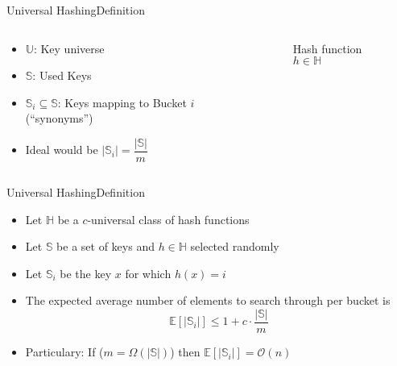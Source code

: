 \begin{frame}{Universal Hashing}{Definition}
  \begin{columns}
    \begin{column}{0.5\linewidth}
      \begin{itemize}
        \item
          {\color{Mittel-Blau}$\mathbb{U}$}:
          Key universe
        \item
          {\color{Mittel-Blau}$\mathbb{S}$}:
          Used Keys
        \item
          {\color{Mittel-Blau}$\mathbb{S}_i \subseteq \mathbb{S}$}:
          Keys mapping to Bucket {\color{Mittel-Blau}$i$} (\enquote{synonyms})
       \item
         Ideal would be
         {\color{Mittel-Blau}$\vert \mathbb{S}_i \vert =\dfrac{\vert \mathbb{S} \vert}{m}$}
      \end{itemize}
    \end{column}
    \begin{column}{0.5\linewidth}
      \begin{figure}[!h]%
        \begin{adjustbox}{width=\linewidth}%
        \end{adjustbox}\vspace*{-2em}
        \caption{Hash function {\color{Mittel-Blau}$h \in \mathbb{H}$}}%
        \label{fig:universal_hashing:hash_function_to_bucket}
      \end{figure}
    \end{column}
  \end{columns}
\end{frame}


\begin{frame}{Universal Hashing}{Definition}
  \begin{itemize}
    \item<1->
      Let {\color{Mittel-Blau}$\mathbb{H}$} be a {\color{Mittel-Blau}$c$}-universal class of hash functions
    \item<2->
      Let {\color{Mittel-Blau}$\mathbb{S}$} be a set of keys and {\color{Mittel-Blau}$h \in \mathbb{H}$} selected randomly
    \item<3->
      Let {\color{Mittel-Blau}$\mathbb{S}_i$} be the key {\color{Mittel-Blau}$x$} for which {\color{Mittel-Blau}$h(x) = i$}
    \item<4->
      The expected average number of elements to search through per 
      bucket is {\color{Mittel-Blau}\[\mathbb{E}\left[\vert \mathbb{S}_i \vert\right]
        \leq 1 + c \cdot \frac{\vert \mathbb{S} \vert}{m}\]}
    \item<5->
      Particulary: If  {\color{Mittel-Blau}($m = \Omega(\vert \mathbb{S} \vert)$)} then
      {\color{Mittel-Blau}$\mathbb{E}\left[\vert \mathbb{S}_i \vert\right] = \mathcal{O}(n)$}
  \end{itemize}
\end{frame}
